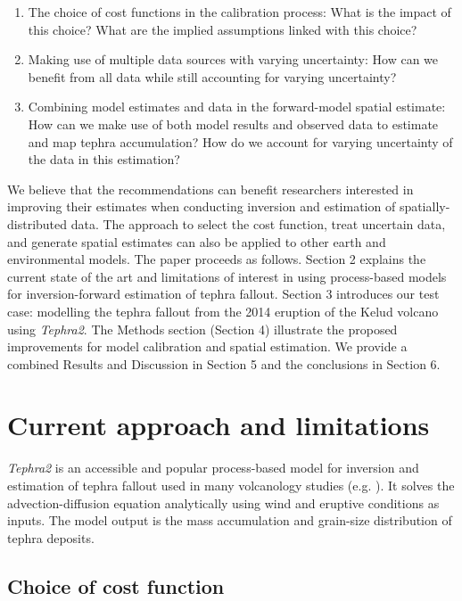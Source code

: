 \begin{enumerate}
    \item The choice of cost functions in the calibration process: What is the impact of this choice? What are the implied assumptions linked with this choice?
    \item Making use of multiple data sources with varying uncertainty: How can we benefit from all data while still accounting for varying uncertainty?
    \item Combining model estimates and data in the forward-model spatial estimate: How can we make use of both model results and observed data to estimate and map tephra accumulation? How do we account for varying uncertainty of the data in this estimation?
\end{enumerate}

We believe that the recommendations can benefit researchers interested in improving their estimates when conducting inversion and estimation of spatially-distributed data. The approach to select the cost function, treat uncertain data, and generate spatial estimates can also be applied to other earth and environmental models. The paper proceeds as follows. Section 2 explains the current state of the art and limitations of interest in using process-based models for inversion-forward estimation of tephra fallout. Section 3 introduces our test case: modelling the tephra fallout from the 2014 eruption of the Kelud volcano using \textit{Tephra2}. The Methods section (Section 4) illustrate the proposed improvements for model calibration and spatial estimation. We provide a combined Results and Discussion in Section 5 and the conclusions in Section 6.


\section{Current approach and limitations} \label{section-calibration}

\textit{Tephra2} is an accessible and popular process-based model for inversion \citep{connor2006inversion} and estimation of tephra fallout used in many volcanology studies (e.g. \citet{volentik2010modeling, costa2012, bonadonna2013, mannen2014, bonadonna2015, connor2019, constantinescu2021, williams2020}). It solves the advection-diffusion equation analytically using wind and eruptive conditions as inputs. The model output is the mass accumulation and grain-size distribution of tephra deposits.

\subsection{Choice of cost function} \label{subsection-tephra2-inversion}

